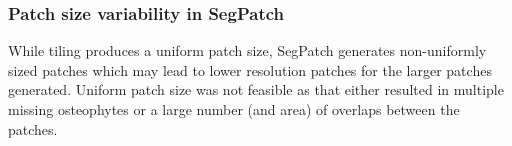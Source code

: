 \documentclass{article}
\newcommand{\update}[1]{\textcolor{black}{#1}}
\begin{document}
\subsubsection{Patch size variability in SegPatch} 
While tiling produces a uniform patch size, SegPatch generates non-uniformly sized patches which may lead to lower resolution patches for the larger patches generated. 
Uniform patch size was not feasible as that either resulted in multiple missing osteophytes or a large number (and area) of overlaps between the patches. 



\end{document}
